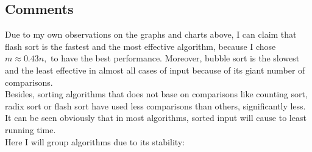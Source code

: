 \documentclass[12pt,a4paper]{article}
\begin{document}
\subsection{Comments}
Due to my own observations on the graphs and charts above, I can claim that flash sort is the fastest and the most effective algorithm, because I chose $m \approx 0.43n,$ to have the best performance. Moreover, bubble sort is the slowest and the least effective in almost all cases of input because of its giant number of comparisons.\\
Besides, sorting algorithms that does not base on comparisons like counting sort, radix sort or flash sort have used less comparisons than others, significantly less.\\
It can be seen obviously that in most algorithms, sorted input will cause to least running time.\\
Here I will group algorithms due to its stability:
\end{document}
